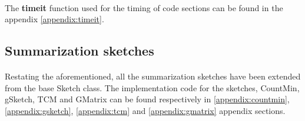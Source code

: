 
\paragraph{}
The \textbf{timeit} function used for the timing of code sections can be found in the appendix \ref{appendix:timeit}.

\subsection{Summarization sketches}

\paragraph{}
Restating the aforementioned, all the summarization sketches have been extended from the base Sketch class. The implementation code for the sketches, CountMin, gSketch, TCM and GMatrix can be found respectively in \ref{appendix:countmin}, \ref{appendix:gsketch}, \ref{appendix:tcm} and \ref{appendix:gmatrix} appendix sections.